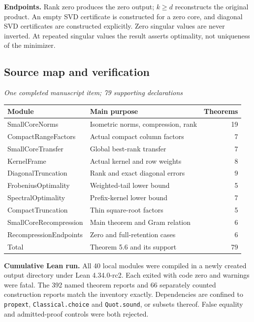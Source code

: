\textbf{Endpoints.} Rank zero produces the zero output; $k\geq d$ reconstructs the original product. An empty SVD certificate is constructed for a zero core, and diagonal SVD certificates are constructed explicitly. Zero singular values are never inverted. At repeated singular values the result asserts optimality, not uniqueness of the minimizer.



\subsection{Source map and verification}\label{supp6:subsection:006}\textit{One completed manuscript item; 79 supporting declarations}\par
\begin{center}\small
\renewcommand{\arraystretch}{1.18}
\begin{tabular}{@{}p{}p{}r@{}}
\toprule
Module & Main purpose & Theorems\\
\midrule
SmallCoreNorms & Isometric norms, compression, rank & 19\\
CompactRangeFactors & Actual compact column factors & 7\\
SmallCoreTransfer & Global best-rank transfer & 7\\
KernelFrame & Actual kernel and row weights & 8\\
DiagonalTruncation & Rank and exact diagonal errors & 9\\
FrobeniusOptimality & Weighted-tail lower bound & 5\\
SpectralOptimality & Prefix-kernel lower bound & 7\\
CompactTruncation & Thin square-root factors & 5\\
SmallCoreRecompression & Main theorem and Gram relation & 6\\
RecompressionEndpoints & Zero and full-retention cases & 6\\
\midrule
Total & Theorem 5.6 and its support & 79\\
\bottomrule
\end{tabular}
\end{center}

\textbf{Cumulative Lean run.} All 40 local modules were compiled in a newly created output directory under Lean 4.34.0-rc2. Each exited with code zero and warnings were fatal. The 392 named theorem reports and 66 separately counted construction reports match the inventory exactly. Dependencies are confined to \texttt{propext}, \texttt{Classical.choice} and \texttt{Quot.sound}, or subsets thereof. False equality and admitted-proof controls were both rejected.

